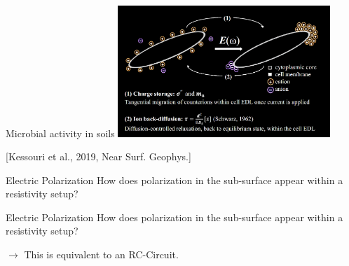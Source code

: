 \begin{frame}{Microbial activity in soils}
    \includegraphics[width=0.6\textwidth]{Figures/InducedPolarization/IP_Microbes_Kessouri2019_NearSurfaceGeophysics.png}
  

  \tiny [Kessouri et al., 2019, Near Surf. Geophys.]
\end{frame}

\begin{frame}
  \begin{PointSix}{Electric Polarization}
    How does polarization in the sub-surface appear within a resistivity setup?
  \end{PointSix}
\end{frame}

\begin{frame}
  \begin{PointSix}{Electric Polarization}
    How does polarization in the sub-surface appear within a resistivity setup?

    $\rightarrow$ This is equivalent to an RC-Circuit.
  \end{PointSix}
\end{frame}

